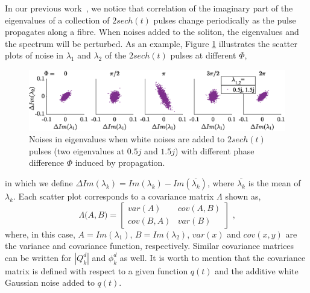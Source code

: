 \documentclass[9pt,twocolumn,twoside]{osajnl}
\begin{document}
In our previous work~\cite{zhang_correlated_2019}, we notice that correlation of the imaginary part of the eigenvalues of a collection of $2sech(t)$ pulses change periodically as the pulse propagates along a fibre. When noises added to the soliton, the eigenvalues and the spectrum will be perturbed. As an example, Figure \ref{fig:fig1} illustrates the scatter plots of noise in $\lambda_1$ and $\lambda_2$ of the $2sech(t)$ pulses at different $\Phi$,
\begin{figure}[htbp]
    \centering
    \includegraphics[width=\linewidth]{Fig0_}
    \caption{Noises in eigenvalues when white noises are added to $2sech(t)$ pulses (two eigenvalues at $0.5j$ and $1.5j$) with different phase difference $\Phi$ induced by propagation.}
    \label{fig:fig1}
\end{figure}
in which we define $\Delta Im(\lambda_k)=Im(\lambda_k)-Im(\overline{\lambda_k})$, where $\overline{\lambda_k}$ is the mean of $\lambda_k$. Each scatter plot corresponds to a covariance matrix $\Lambda$ shown as,
\begin{equation}
    \Lambda\Big(A,B\Big)=
    \begin{bmatrix} 
        var(A) & cov(A,B)\\
        cov(B,A) & var(B)
    \end{bmatrix}\text{ ,}
    \label{eq:CovDefNFTphaseDifference}
\end{equation}
where, in this case, $A=Im(\lambda_1)$, $B=Im(\lambda_2)$, $var(x)$ and $cov(x,y)$ are the variance and covariance function, respectively. Similar covariance matrices can be written for $|Q^d_k|$ and $\phi^d_k$ as well. It is worth to mention that the covariance matrix is defined with respect to a given function $q(t)$ and the additive white Gaussian noise added to $q(t)$.
\end{document}
